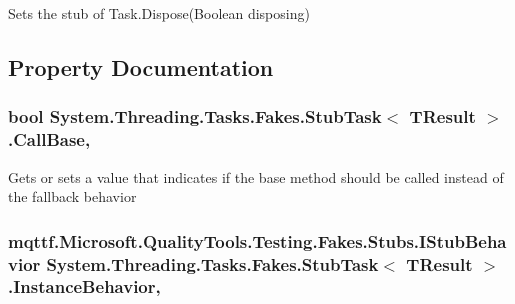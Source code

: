 Sets the stub of Task.\-Dispose(\-Boolean disposing)



\subsection{Property Documentation}
\hypertarget{class_system_1_1_threading_1_1_tasks_1_1_fakes_1_1_stub_task_3_01_t_result_01_4_a0b918aae6fee25db61e55219e9a58f02}{
\subsubsection[{Call\-Base}]{\setlength{\rightskip}{0pt plus 5cm}bool {\bf System.\-Threading.\-Tasks.\-Fakes.\-Stub\-Task}$<$ T\-Result $>$.Call\-Base\hspace{0.3cm}{\ttfamily [get]}, {\ttfamily [set]}}}\label{class_system_1_1_threading_1_1_tasks_1_1_fakes_1_1_stub_task_3_01_t_result_01_4_a0b918aae6fee25db61e55219e9a58f02}


Gets or sets a value that indicates if the base method should be called instead of the fallback behavior

\hypertarget{class_system_1_1_threading_1_1_tasks_1_1_fakes_1_1_stub_task_3_01_t_result_01_4_a54b552df7e85c8533e5a25b8063dec6c}{
\subsubsection[{Instance\-Behavior}]{\setlength{\rightskip}{0pt plus 5cm}mqttf.\-Microsoft.\-Quality\-Tools.\-Testing.\-Fakes.\-Stubs.\-I\-Stub\-Behavior {\bf System.\-Threading.\-Tasks.\-Fakes.\-Stub\-Task}$<$ T\-Result $>$.Instance\-Behavior\hspace{0.3cm}{\ttfamily [get]}, {\ttfamily [set]}}}\label{class_system_1_1_threading_1_1_tasks_1_1_fakes_1_1_stub_task_3_01_t_result_01_4_a54b552df7e85c8533e5a25b8063dec6c}



